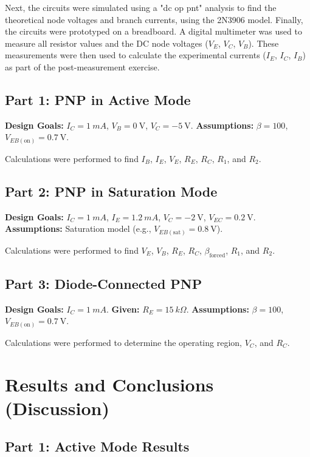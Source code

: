 \documentclass[12pt]{article}
\begin{document}
Next, the circuits were simulated using a "dc op pnt" analysis to find the theoretical node voltages and branch currents, using the 2N3906 model. Finally, the circuits were prototyped on a breadboard. A digital multimeter was used to measure all resistor values and the DC node voltages ($V_E$, $V_C$, $V_B$). These measurements were then used to calculate the experimental currents ($I_E$, $I_C$, $I_B$) as part of the post-measurement exercise.

\subsection{Part 1: PNP in Active Mode}
\textbf{Design Goals:} $I_C = \SI{1}{mA}$, $V_B = \SI{0}{\volt}$, $V_C = \SI{-5}{\volt}$.
\textbf{Assumptions:} $\beta = 100$, $V_{EB(\text{on})} = \SI{0.7}{\volt}$.

Calculations were performed to find $I_B$, $I_E$, $V_E$, $R_E$, $R_C$, $R_1$, and $R_2$.

\subsection{Part 2: PNP in Saturation Mode}
\textbf{Design Goals:} $I_C = \SI{1}{mA}$, $I_E = \SI{1.2}{mA}$, $V_C = \SI{-2}{\volt}$, $V_{EC} = \SI{0.2}{\volt}$.
\textbf{Assumptions:} Saturation model (e.g., $V_{EB(\text{sat})} = \SI{0.8}{\volt}$).

Calculations were performed to find $V_E$, $V_B$, $R_E$, $R_C$, $\beta_{\text{forced}}$, $R_1$, and $R_2$.

\subsection{Part 3: Diode-Connected PNP}
\textbf{Design Goals:} $I_C = \SI{1}{mA}$.
\textbf{Given:} $R_E = \SI{15}{k\Omega}$.
\textbf{Assumptions:} $\beta = 100$, $V_{EB(\text{on})} = \SI{0.7}{\volt}$.

Calculations were performed to determine the operating region, $V_C$, and $R_C$.

\section{Results and Conclusions (Discussion)}

\subsection{Part 1: Active Mode Results}
\end{document}
